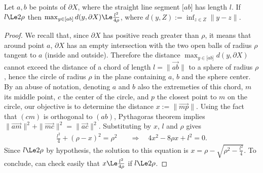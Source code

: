 \begin{lemma}\label{lem-segment-is-close-to-dX}
    Let $a,b$ be points of $\partial X$, where the straight line segment
    $\lbrack ab \rbrack$ has length $l$. If $l \Le 2\rho$ then $\max_{y
    \in \lbrack ab \rbrack} d(y, \partial X) \Le \frac{l^2}{4\rho}$,
    where $d(y,Z):=\inf_{z \in Z} \| y-z\|$.
\end{lemma}
\begin{proof}
    We recall that, since $\partial X$ has positive reach greater than
    $\rho$, it means that around point $a$, $\partial X$ has an empty
    intersection with the two open balls of radius $\rho$ tangent to $a$
    (inside and outside). Therefore the distance $\max_{y \in \lbrack ab
    \rbrack} d(y, \partial X)$ cannot exceed the distance of a chord
    of length $l=\| \vec{ab}\|$ to a sphere of radius $\rho$, hence the
    circle of radius $\rho$ in the plane containing $a$, $b$ and the
    sphere center. By an abuse of notation, denoting $a$ and $b$ also
    the extremeties of this chord, $m$ its middle point, $c$ the center
    of the circle, and $p$ the closest point to $m$ on the circle, our
    objective is to determine the distance $x:=\| \vec{mp}\|$. Using the
    fact that $(cm)$ is orthogonal to $(ab)$, Pythagoras theorem implies
    $\|\vec{am}\|^2 + \|\vec{mc}\|^2 = \|\vec{ac}\|^2$. Substituting by
    $x$, $l$ and $\rho$ gives
    \begin{align*}
        \frac{l^2}{4}+(\rho-x)^2 = \rho^2 &
        \quad \Rightarrow \quad 4x^2 - 8 \rho x + l^2 = 0.
    \end{align*}
    Since $l \Le 2\rho$ by hypothesis, the solution to this equation is
    $x=\rho-\sqrt{\rho^2-\frac{l^2}{4}}$. To conclude,  can check
    easily that $x \Le \frac{l^2}{4\rho}$ if $l \Le
    2\rho$.
\end{proof}

